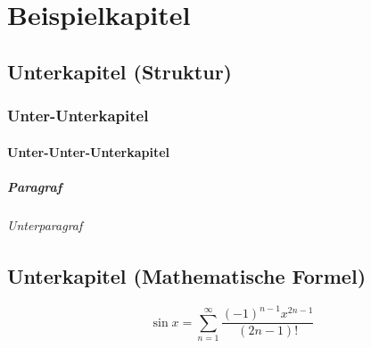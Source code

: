 \chapter{Beispielkapitel}
\lipsum[1] \autocite{samulowitzBibliothekUndDokumentation2003,sarrafzadehKnowledgeManagementIts2010,saurWissenschaftlicheVerlageVersuch2016,scholzeOpenAccessUnd2016,schrettingerVersuchVollstaendigenLehrbuchs1829,seadleFragilityFutureLibrary2016,siegfriedNutzerbezogeneMarktforschungFuer2014}

\section{Unterkapitel (Struktur)}
\lipsum[3-4]

\subsection{Unter-Unterkapitel}
\lipsum[5-6]

\subsubsection{Unter-Unter-Unterkapitel}
\lipsum[66]

\paragraph{Paragraf}
\lipsum[66]

\subparagraph{Unterparagraf}
\lipsum[75]

\section{Unterkapitel (Mathematische Formel)}
\lipsum[1-5]
\begin{equation}
    \sin x = \sum\limits_{n = 1}^\infty  {\frac{{\left( { - 1} \right)^{n - 1} x^{2n - 1} }}{{\left( {2n - 1} \right)!}}}    
\end{equation}
\lipsum[75]